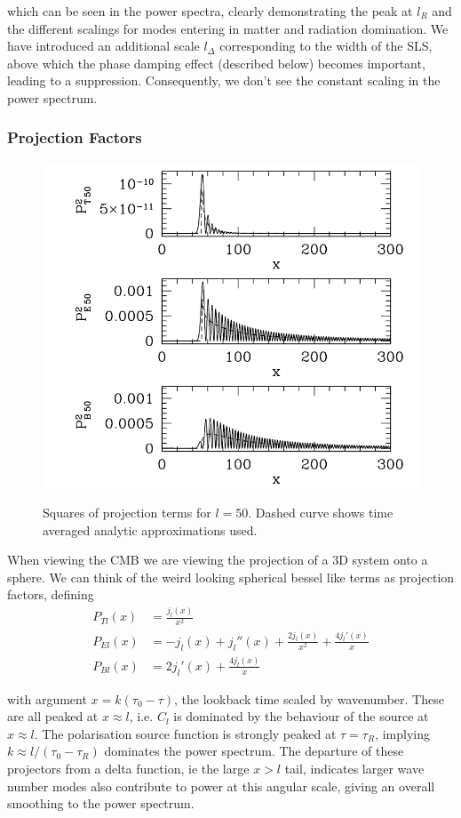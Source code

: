 \documentclass[a4paper,10pt]{article}
\begin{document}
which can be seen in the power spectra, clearly demonstrating the peak at $l_R$ and the different scalings for modes entering in matter and radiation domination. We have introduced an additional scale $l_\Delta$ corresponding to the width of the SLS, above which the phase damping effect (described below) becomes important, leading to a suppression. Consequently, we don't see the constant scaling in the power spectrum. 

\subsubsection{Projection Factors}

\begin{figure}[h]
  \includegraphics[width=0.7\linewidth]{projection.png}
  \label{proj}
  \centering
  \caption{Squares of projection terms for $l=50$. Dashed curve shows time averaged analytic approximations used.}
\end{figure}

When viewing the CMB we are viewing the projection of a 3D system onto a sphere. We can think of the weird looking spherical bessel like terms as projection factors, defining
\begin{align}
P_{Tl}(x) &= \frac{j_l(x)}{x^2}\\
P_{El}(x) &= -j_l(x) +j_l''(x)+\frac{2j_l(x)}{x^2} + \frac{4j_l'(x)}{x}\\
P_{Bl}(x) &= 2j_l'(x)+\frac{4j_l(x)}{x}
\end{align}

with argument $x=k(\tau_0-\tau)$, the lookback time scaled by wavenumber. These are all peaked at $x\approx l$, i.e. $C_l$ is dominated by the behaviour of the source at $x\approx l$. The polarisation source function is strongly peaked at $\tau=\tau_R$, implying $k\approx l/(\tau_0-\tau_R)$ dominates the power spectrum. The departure of these projectors from a delta function, ie the large $x>l$ tail, indicates larger wave number modes also contribute to power at this angular scale, giving an overall smoothing to the power spectrum.\\
\end{document}
